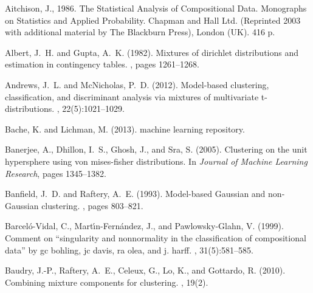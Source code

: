 \documentclass[preprint, review, 3p, authoryear]{elsarticle}
\begin{document}
\begin{thebibliography}{00}

Aitchison, J., 1986. The Statistical Analysis of Compositional Data. Monographs on Statistics and
Applied Probability. Chapman and Hall Ltd. (Reprinted 2003 with additional material by The
Blackburn Press), London (UK). 416 p.

Albert, J.~H. and Gupta, A.~K. (1982).
\newblock Mixtures of dirichlet distributions and estimation in contingency
  tables.
, pages 1261--1268.

Andrews, J.~L. and McNicholas, P.~D. (2012).
\newblock Model-based clustering, classification, and discriminant analysis via
  mixtures of multivariate t-distributions.
, 22(5):1021--1029.

Bache, K. and Lichman, M. (2013).
 machine learning repository.

Banerjee, A., Dhillon, I.~S., Ghosh, J., and Sra, S. (2005).
\newblock Clustering on the unit hypersphere using von mises-fisher
  distributions.
\newblock In {\em Journal of Machine Learning Research}, pages 1345--1382.

Banfield, J.~D. and Raftery, A.~E. (1993).
\newblock Model-based Gaussian and non-Gaussian clustering.
, pages 803--821.

Barcel{\'o}-Vidal, C., Mart{\'\i}n-Fern{\'a}ndez, J., and Pawlowsky-Glahn, V.
  (1999).
\newblock Comment on ``singularity and nonnormality in the classification of
  compositional data'' by gc bohling, jc davis, ra olea, and j. harff.
, 31(5):581--585.


Baudry, J.-P., Raftery, A.~E., Celeux, G., Lo, K., and Gottardo, R. (2010).
\newblock Combining mixture components for clustering.
, 19(2).


\end{thebibliography}
\end{document}
